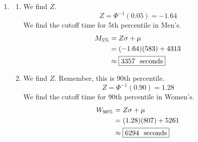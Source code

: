 \documentclass[12pt,letterpaper]{article}
\begin{document}
\begin{enumerate}
\item \begin{enumerate}
\item We find $Z$.
$$Z = \Phi^{-1}(0.05) = -1.64 $$
We find the cutoff time for 5th percentile in Men's.
\begin{align*}
M_\text{5\%} &= Z\sigma + \mu \\
             &= (-1.64)(583) + 4313\\
             &\approx \fbox{3357 \text{ seconds}}
\end{align*}
\item We find $Z$. Remember, this is 90th percentile.
$$Z = \Phi^{-1}(0.90) = 1.28 $$
We find the cutoff time for 90th percentile in Women's.
\begin{align*}
W_\text{90\%} &= Z\sigma + \mu \\
             &= (1.28)(807) + 5261\\
             &\approx \fbox{6294 \text{ seconds}}
\end{align*}
\end{enumerate}

\newpage


\end{enumerate}
\end{document}
